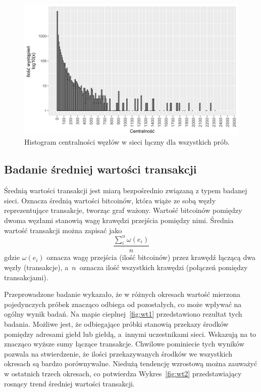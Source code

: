 \documentclass[12pt, oneside, final, openany]{mgr}
\newcommand{\chartsWidth}{0.80}
\begin{document}
\begin{figure}[H]
\centering
   \includegraphics[width=\chartsWidth\linewidth]{pictures/srednia_centralnosc/srednia_centralnosc_hist.png}
   \caption{Histogram centralności węzłów w sieci łączny dla wszystkich prób.}
   \label{fig:sc3}
\end{figure}

\subsection{Badanie średniej wartości transakcji}
\label{wartosc_transakcji}
\indent Średnią wartości transakcji jest miarą bezpośrednio związaną z typem badanej sieci. Oznacza średnią wartości bitcoinów, która wiąże ze sobą węzły reprezentujące transakcje, tworząc graf ważony. Wartość bitcoinów pomiędzy dwoma węzłami stanowią wagę krawędzi przejścia pomiędzy nimi. Średnia wartość transakcji można zapisać jako
\begin{equation}
\label{eq:wartosc_transakcji}
\frac{\sum_{i}^{n} \omega(e_i)}{n}
\end{equation}
gdzie $\omega(e_i)$ oznacza wagę przejścia (ilość bitcoinów) przez krawędź łączącą dwa węzły (transakcje), a~$n$~oznacza ilość wszystkich krawędzi (połączeń pomiędzy transakcjami). 

\indent Przeprowadzone badanie wykazało, że w różnych okresach wartość mierzona pojedynczych próbek znacząco odbiega od pozostałych, co może wpływać na ogólny wynik badań.
Na mapie cieplnej~\ref{fig:wt1} przedstawiono rezultat tych badania. Możliwe jest, że odbiegające próbki stanowią przekazy środków pomiędzy adresami giełd lub giełdą, a~innymi uczestnikami sieci. Wskazują na to znacząco wyższe sumy łączące transakcje. Chwilowe pominiecie tych wyników pozwala na stwierdzenie, że ilości przekazywanych środków we wszystkich okresach są bardzo porównywalne. Niedużą tendencję wzrostową można zauważyć w ostatnich trzech okresach, co potwierdza Wykres~\ref{fig:wt2} przedstawiający rosnący trend średniej wartości transakcji. 
\end{document}
